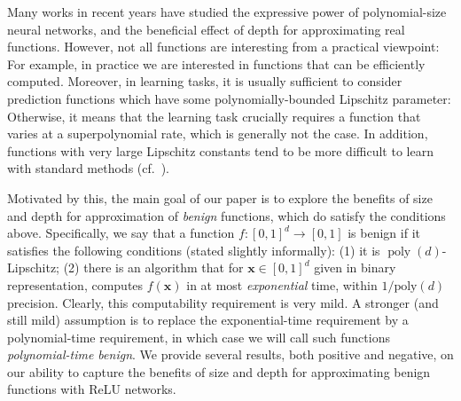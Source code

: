 \documentclass[11pt]{article}
\newcommand{\bx}{\mathbf{x}}
\DeclareMathOperator{\poly}{poly}
\begin{document}
Many works in recent years have studied 
the expressive power of polynomial-size neural networks, and the beneficial effect of depth for approximating real functions.
However, not all functions are interesting from a practical viewpoint: For example, in practice we are interested in functions that can be efficiently computed. Moreover, in learning tasks, it is usually sufficient to consider prediction functions which have some polynomially-bounded Lipschitz parameter: Otherwise, it means that the learning task crucially requires a function that varies at a superpolynomial rate, which is generally not the case. In addition, functions with very large Lipschitz constants tend to be more difficult to learn with standard methods (cf.~\cite{safran2019depth,malach2021connection}). 

Motivated by this, the main goal of our paper is to explore the benefits of size and depth for approximation of \emph{benign} functions, which do satisfy the conditions above. Specifically, we say that a function $f:[0,1]^d \rightarrow [0,1]$ is benign if it satisfies the following conditions (stated slightly informally): (1) it is $\poly(d)$-Lipschitz; (2) there is an algorithm that for $\bx \in [0,1]^d$ given in binary representation, computes $f(\bx)$ in at most \emph{exponential} time, within 
$1/\text{poly}(d)$ precision.
Clearly, this computability requirement is very mild. A stronger (and still mild) assumption is to replace the exponential-time requirement by a polynomial-time requirement, in which case we will call such functions {\em polynomial-time benign}.
We provide several results, both positive and negative, on our ability to capture the benefits of size and depth for approximating benign functions with ReLU networks. 
\end{document}
